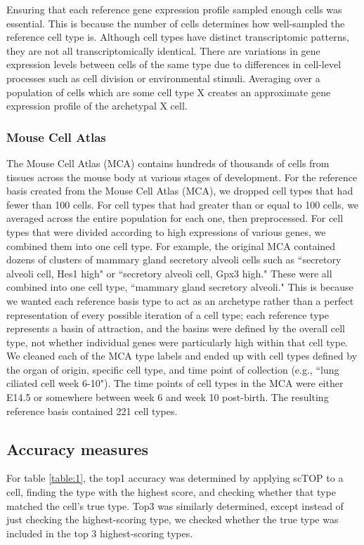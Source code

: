 \documentclass[aps,superscriptaddress, notitlepage,longbibliography]{revtex4-1}
\begin{document}
Ensuring that each reference gene expression profile sampled enough cells was essential. This is because the number of cells determines how well-sampled the reference cell type is. Although cell types have distinct transcriptomic patterns, they are not all transcriptomically identical. There are variations in gene expression levels between cells of the same type due to differences in cell-level processes such as cell division or environmental stimuli. Averaging over a population of cells which are some cell type X creates an approximate gene expression profile of the archetypal X cell. 

\subsubsection{Mouse Cell Atlas}
The Mouse Cell Atlas (MCA) contains hundreds of thousands of cells from tissues across the mouse body at various stages of development. For the reference basis created from the Mouse Cell Atlas (MCA), we dropped cell types that had fewer than 100 cells. For cell types that had greater than or equal to 100 cells, we averaged across the entire population for each one, then preprocessed. For cell types that were divided according to high expressions of various genes, we combined them into one cell type. For example, the original MCA contained dozens of clusters of mammary gland secretory alveoli cells such as ``secretory alveoli cell, Hes1 high" or ``secretory alveoli cell, Gpx3 high." These were all combined into one cell type, ``mammary gland secretory alveoli." This is because we wanted each reference basis type to act as an archetype rather than a perfect representation of every possible iteration of a cell type; each reference type represents a basin of attraction, and the basins were defined by the overall cell type, not whether individual genes were particularly high within that cell type. We cleaned each of the MCA type labels and ended up with cell types defined by the organ of origin, specific cell type, and time point of collection (e.g., ``lung ciliated cell week 6-10"). The time points of cell types in the MCA were either E14.5 or somewhere between week 6 and week 10 post-birth.   The resulting reference basis contained 221 cell types.

\subsection{Accuracy measures}
For table \ref{table:1}, the top1 accuracy was determined by applying scTOP to a cell, finding the type with the highest score, and checking whether that type matched the cell's true type. Top3 was similarly determined, except instead of just checking the highest-scoring type, we checked whether the true type was included in the top 3 highest-scoring types.
\end{document}
